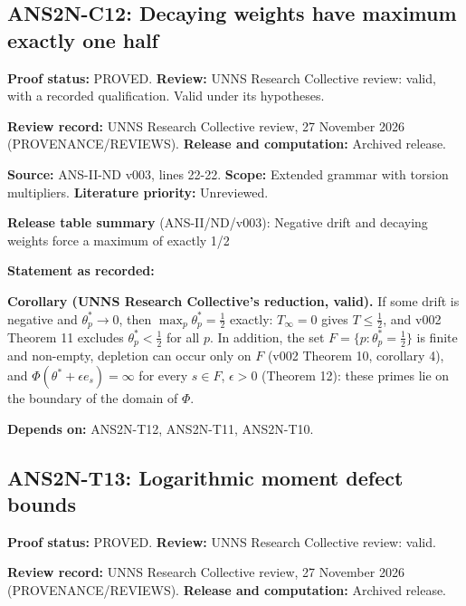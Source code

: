 \documentclass[
  11pt,
]{article}
\begin{document}
\hypertarget{ans2n-c12-decaying-weights-have-maximum-exactly-one-half}{%
\subsection{ANS2N-C12: Decaying weights have maximum exactly one
half}\label{ans2n-c12-decaying-weights-have-maximum-exactly-one-half}}

\textbf{Proof status:} PROVED. \textbf{Review:} UNNS Research Collective
review: valid, with a recorded qualification. Valid under its
hypotheses.

\textbf{Review record:} UNNS Research Collective review, 27 November
2026 (PROVENANCE/REVIEWS). \textbf{Release and computation:} Archived
release.

\textbf{Source:} ANS-II-ND v003, lines 22-22. \textbf{Scope:} Extended
grammar with torsion multipliers. \textbf{Literature priority:}
Unreviewed.

\textbf{Release table summary} (ANS-II/ND/v003): Negative drift and
decaying weights force a maximum of exactly 1/2

\textbf{Statement as recorded:}

\textbf{Corollary (UNNS Research Collective's reduction, valid).} If
some drift is negative and \(\theta^\ast_p\to0\), then
\(\max_p\theta^\ast_p=\frac12\) exactly: \(T_\infty=0\) gives
\(T\le\frac12\), and v002 Theorem 11 excludes \(\theta^\ast_p<\frac12\)
for all \(p\). In addition, the set \(F=\{p:\theta^\ast_p=\frac12\}\) is
finite and non-empty, depletion can occur only on \(F\) (v002 Theorem
10, corollary 4), and \(\Phi(\theta^\ast+\epsilon e_s)=\infty\) for
every \(s\in F\), \(\epsilon>0\) (Theorem 12): these primes lie on the
boundary of the domain of \(\Phi\).

\textbf{Depends on:} ANS2N-T12, ANS2N-T11, ANS2N-T10.

\hypertarget{ans2n-t13-logarithmic-moment-defect-bounds}{%
\subsection{ANS2N-T13: Logarithmic moment defect
bounds}\label{ans2n-t13-logarithmic-moment-defect-bounds}}

\textbf{Proof status:} PROVED. \textbf{Review:} UNNS Research Collective
review: valid.

\textbf{Review record:} UNNS Research Collective review, 27 November
2026 (PROVENANCE/REVIEWS). \textbf{Release and computation:} Archived
release.
\end{document}
